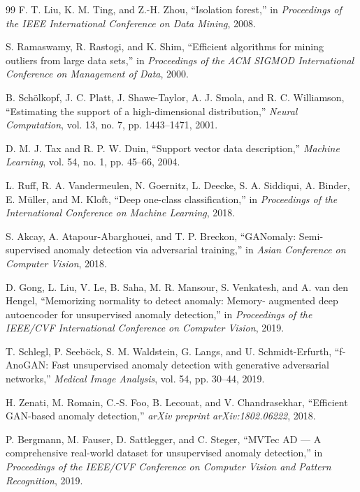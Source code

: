 \documentclass[10pt,conference]{IEEEtran}
\begin{document}
\begin{thebibliography}{99}
F. T. Liu, K. M. Ting, and Z.-H. Zhou, ``Isolation forest,'' in
\emph{Proceedings of the IEEE International Conference on Data Mining}, 2008.

S. Ramaswamy, R. Rastogi, and K. Shim, ``Efficient algorithms for mining
outliers from large data sets,'' in \emph{Proceedings of the ACM SIGMOD
International Conference on Management of Data}, 2000.

B. Sch\"olkopf, J. C. Platt, J. Shawe-Taylor, A. J. Smola, and
R. C. Williamson, ``Estimating the support of a high-dimensional
distribution,'' \emph{Neural Computation}, vol. 13, no. 7, pp. 1443--1471,
2001.

D. M. J. Tax and R. P. W. Duin, ``Support vector data description,''
\emph{Machine Learning}, vol. 54, no. 1, pp. 45--66, 2004.

L. Ruff, R. A. Vandermeulen, N. Goernitz, L. Deecke, S. A. Siddiqui,
A. Binder, E. M\"uller, and M. Kloft, ``Deep one-class classification,'' in
\emph{Proceedings of the International Conference on Machine Learning}, 2018.

S. Akcay, A. Atapour-Abarghouei, and T. P. Breckon, ``GANomaly:
Semi-supervised anomaly detection via adversarial training,'' in
\emph{Asian Conference on Computer Vision}, 2018.

D. Gong, L. Liu, V. Le, B. Saha, M. R. Mansour, S. Venkatesh, and
A. van den Hengel, ``Memorizing normality to detect anomaly: Memory-
augmented deep autoencoder for unsupervised anomaly detection,'' in
\emph{Proceedings of the IEEE/CVF International Conference on Computer
Vision}, 2019.

T. Schlegl, P. Seeb\"ock, S. M. Waldstein, G. Langs, and
U. Schmidt-Erfurth, ``f-AnoGAN: Fast unsupervised anomaly detection with
generative adversarial networks,'' \emph{Medical Image Analysis}, vol. 54,
pp. 30--44, 2019.

H. Zenati, M. Romain, C.-S. Foo, B. Lecouat, and V. Chandrasekhar,
``Efficient GAN-based anomaly detection,'' \emph{arXiv preprint
arXiv:1802.06222}, 2018.

P. Bergmann, M. Fauser, D. Sattlegger, and C. Steger, ``MVTec AD --- A
comprehensive real-world dataset for unsupervised anomaly detection,'' in
\emph{Proceedings of the IEEE/CVF Conference on Computer Vision and Pattern
Recognition}, 2019.


\end{thebibliography}
\end{document}
